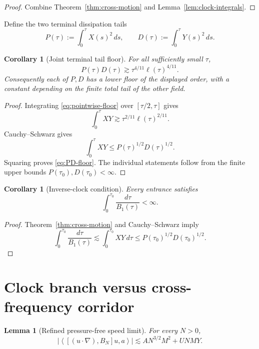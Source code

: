 \documentclass[11pt]{article}
\newtheorem{lemma}[theorem]{Lemma}
\newtheorem{corollary}[theorem]{Corollary}
\theoremstyle{remark}
\newcommand{\ip}[2]{\left\langle#1,#2\right\rangle}
\begin{document}
\begin{proof}
Combine Theorem~\ref{thm:cross-motion} and
Lemma~\ref{lem:clock-integrals}.
\end{proof}

Define the two terminal dissipation tails
\begin{equation}
\label{eq:PD}
 P(\tau):=\int_0^\tau X(s)^2\,ds,
 \qquad
 D(\tau):=\int_0^\tau Y(s)^2\,ds.
\end{equation}

\begin{corollary}[Joint terminal tail floor]
\label{cor:tail-floor}
For all sufficiently small \(\tau\),
\begin{equation}
\label{eq:PD-floor}
 \boxed{
 P(\tau)D(\tau)
 \gtrsim
 \tau^{4/11}\ell(\tau)^{4/11}.
 }
\end{equation}
Consequently each of \(P,D\) has a lower floor of the displayed order,
with a constant depending on the finite total tail of the other field.
\end{corollary}

\begin{proof}
Integrating \eqref{eq:pointwise-floor} over
\([\tau/2,\tau]\) gives
\[
 \int_0^\tau XY
 \gtrsim
 \tau^{2/11}\ell(\tau)^{2/11}.
\]
Cauchy--Schwarz gives
\[
 \int_0^\tau XY
 \leq
 P(\tau)^{1/2}D(\tau)^{1/2}.
\]
Squaring proves \eqref{eq:PD-floor}.  The individual statements follow
from the finite upper bounds \(P(\tau_0),D(\tau_0)<\infty\).
\end{proof}

\begin{corollary}[Inverse-clock condition]
\label{cor:inverse-clock}
Every entrance satisfies
\begin{equation}
\label{eq:inverse-clock}
 \boxed{
 \int_0^{\tau_0}\frac{d\tau}{B_1(\tau)}<\infty.
 }
\end{equation}
\end{corollary}

\begin{proof}
Theorem~\ref{thm:cross-motion} and Cauchy--Schwarz imply
\[
 \int_0^{\tau_0}\frac{d\tau}{B_1(\tau)}
 \lesssim
 \int_0^{\tau_0}XY\,d\tau
 \leq
 P(\tau_0)^{1/2}D(\tau_0)^{1/2}.
\]
\end{proof}

\section{Clock branch versus cross-frequency corridor}

\begin{lemma}[Refined pressure-free speed limit]
\label{lem:refined-speed}
For every \(N>0\),
\begin{equation}
\label{eq:refined-speed}
 \boxed{
 \left|
 \ip{[(u\cdot\nabla),B_N]u}{a}
 \right|
 \lesssim
 A N^{3/2}M^2
 +
 U NMY.
 }
\end{equation}
\end{lemma}
\end{document}
